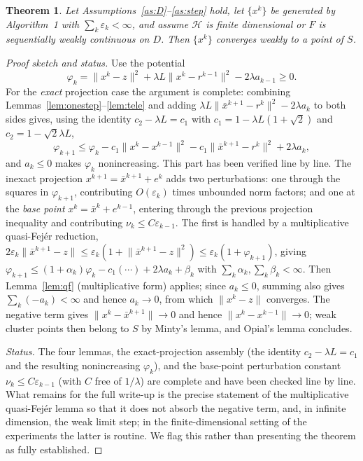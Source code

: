 \documentclass[11pt]{article}
\theoremstyle{plain}
\newtheorem{theorem}{Theorem}[section]
\theoremstyle{definition}
\theoremstyle{remark}
\newcommand{\HH}{\mathcal{H}}
\newcommand{\norm}[1]{\lVert #1 \rVert}
\begin{document}
\begin{theorem}
\label{thm:weak}
Let Assumptions~\ref{as:D}--\ref{as:step} hold, let $\{x^k\}$ be generated by
Algorithm~1 with $\sum_k \varepsilon_k < \infty$, and assume $\HH$ is finite
dimensional or $F$ is sequentially weakly continuous on $D$. Then $\{x^k\}$
converges weakly to a point of $S$.
\end{theorem}

\begin{proof}[Proof sketch and status]
Use the potential
\[
\varphi_k = \norm{x^k-z}^2 + \lambda L \norm{x^k - r^{k-1}}^2 - 2\lambda
a_{k-1} \ge 0 .
\]
For the \emph{exact} projection case the argument is complete: combining
Lemmas~\ref{lem:onestep}--\ref{lem:tele} and adding
$\lambda L\norm{\bar x^{k+1}-r^k}^2 - 2\lambda a_k$ to both sides gives, using
the identity $c_2 - \lambda L = c_1$ with $c_1 = 1-\lambda L(1+\sqrt2)$ and
$c_2 = 1-\sqrt2\lambda L$,
\[
\varphi_{k+1} \le \varphi_k - c_1\norm{x^k-x^{k-1}}^2
- c_1\norm{\bar x^{k+1}-r^k}^2 + 2\lambda a_k ,
\]
and $a_k \le 0$ makes $\varphi_k$ nonincreasing. This part has been verified
line by line. The inexact projection $x^{k+1} = \bar x^{k+1} + e^k$ adds two
perturbations: one through the squares in $\varphi_{k+1}$, contributing
$O(\varepsilon_k)$ times unbounded norm factors; and one at the \emph{base
point} $x^k = \bar x^k + e^{k-1}$, entering through the previous projection
inequality and contributing $\nu_k \le C\varepsilon_{k-1}$. The first is handled
by a multiplicative quasi-Fej\'er reduction, $2\varepsilon_k\norm{\bar
x^{k+1}-z} \le \varepsilon_k(1+\norm{\bar x^{k+1}-z}^2) \le
\varepsilon_k(1+\varphi_{k+1})$, giving $\varphi_{k+1} \le (1+\alpha_k)\varphi_k
- c_1(\cdots) + 2\lambda a_k + \beta_k$ with $\sum_k \alpha_k, \sum_k \beta_k <
\infty$. Then Lemma~\ref{lem:qf} (multiplicative form) applies; since $a_k \le
0$, summing also gives $\sum_k (-a_k) < \infty$ and hence $a_k \to 0$,
from which $\norm{x^k - z}$ converges. The negative term gives $\norm{x^k -
\bar x^{k+1}} \to 0$ and hence $\norm{x^k - x^{k-1}} \to 0$; weak cluster
points then belong to $S$ by Minty's lemma, and Opial's lemma concludes.

\emph{Status.} The four lemmas, the exact-projection assembly (the identity
$c_2-\lambda L=c_1$ and the resulting nonincreasing $\varphi_k$), and the
base-point perturbation constant $\nu_k \le C\varepsilon_{k-1}$ (with $C$ free
of $1/\lambda$) are complete and have been checked line by line. What remains
for the full write-up is the precise statement of the multiplicative
quasi-Fej\'er lemma so that it does not absorb the negative term, and, in
infinite dimension, the weak limit step; in the finite-dimensional setting of
the experiments the latter is routine. We flag this rather than presenting the
theorem as fully established.
\end{proof}
\end{document}
